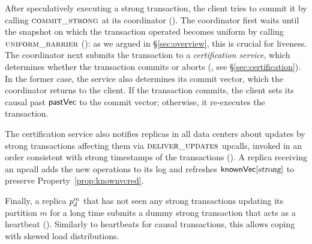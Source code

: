 After speculatively executing a strong transaction, the client tries to commit
it by calling $\textsc{commit\_strong}$ at its coordinator
(). The coordinator first waits until the
snapshot on which the transaction operated becomes uniform by calling
$\textsc{uniform\_barrier}$ (): as we argued in
\S\ref{sec:overview}, this is crucial for liveness.
The coordinator next submits the transaction to a \emph{certification service},
which determines whether the transaction commits or aborts
(, see \S\ref{sec:certification}).
In the former case, the service also determines its commit vector,
which the coordinator returns to the client. If the transaction commits,
the client sets its causal past ${\sf pastVec}$ to the commit vector; otherwise, 
it re-executes the transaction. 

The certification service also notifies replicas in all data centers about
updates by strong transactions affecting them via $\textsc{deliver\_updates}$ upcalls, invoked
in an order consistent with strong timestamps of the transactions
(). A replica receiving an upcall adds
the new operations to its log and refreshes ${\sf knownVec}[\textsl{strong}]$ to
preserve Property~\ref{prop:knownvcred}.

Finally, a replica $\partition^m_d$ that has not seen any strong transactions
updating its partition $m$ for a long time submits a dummy strong transaction
that acts as a heartbeat (). Similarly to
heartbeats for causal transactions, this allows coping with skewed load
distributions.


